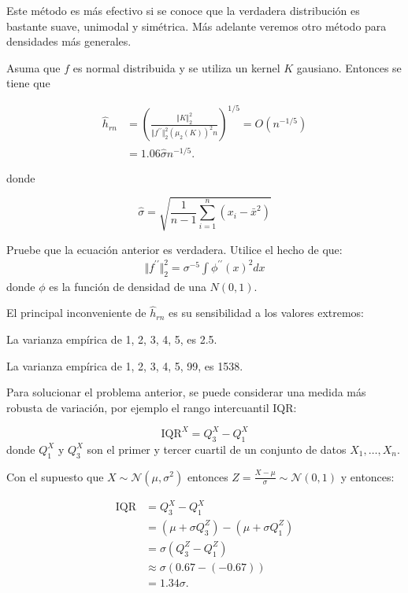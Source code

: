 \documentclass[
  12pt,
]{book}
\begin{document}
Este método es más efectivo si se conoce que la verdadera distribución
es bastante suave, unimodal y simétrica. Más adelante veremos otro
método para densidades más generales.

Asuma que \(f\) es normal distribuida y se utiliza un kernel \(K\)
gausiano. Entonces se tiene que

\begin{align*}
\hat{h}_{rn} & =\left(\frac{\Vert K\Vert_{2}^{2}}{\Vert f^{\prime\prime}\Vert_{2}^{2}\left(\mu_{2}(K)\right)^{2}n}\right)^{1/5}=O\left( n^{-1/5} \right) \\
& =1.06 \hat{\sigma} n^{-1/5}.
\end{align*}

donde

\begin{equation*}
\hat{\sigma} = \sqrt{\frac{1}{n-1} \sum_{i=1}^{n} \left( x_{i}-\bar{x}^{2} \right)}
\end{equation*}

\leavevmode{}%
Pruebe que la ecuación anterior es verdadera. Utilice el hecho de que:
\begin{align*}
\Vert f^{\prime\prime}\Vert_{2}^{2}=\sigma^{-5}\int \phi^{\prime \prime}(x)^2 dx
\end{align*} donde \(\phi\) es la función de densidad de una \(N(0,1)\).

El principal inconveniente de \(\hat{h}_{rn}\) es su sensibilidad a los
valores extremos:

\leavevmode{}%
La varianza empírica de 1, 2, 3, 4, 5, es 2.5.

La varianza empírica de 1, 2, 3, 4, 5, 99, es 1538.

Para solucionar el problema anterior, se puede considerar una medida más
robusta de variación, por ejemplo el rango intercuantil IQR:

\begin{equation*}
\mathrm{IQR}^{X} = Q^{X}_{3} - Q^{X}_{1}
\end{equation*} donde \(Q^{X}_{1}\) y \(Q^{X}_{3}\) son el primer y
tercer cuartil de un conjunto de datos \(X_{1},\ldots, X_n\).

Con el supuesto que \(X\sim \mathcal{N}(\mu,\sigma^{2})\) entonces
\(\displaystyle Z = \frac{X-\mu}{\sigma} \sim \mathcal{N}(0,1)\) y
entonces:

\begin{align*}
\mathrm{IQR}
& = Q^{X}_{3} - Q^{X}_{1}                                                     \\
& = \left( \mu+\sigma Q^{Z}_{3} \right) - \left( \mu+\sigma Q^{Z}_{1} \right) \\
& = \sigma \left(Q^{Z}_{3} - Q^{Z}_{1} \right)                                \\
& \approx \sigma \left( 0.67 - (-0.67) \right)                                 \\
& =1.34 \sigma.
\end{align*}
\end{document}
